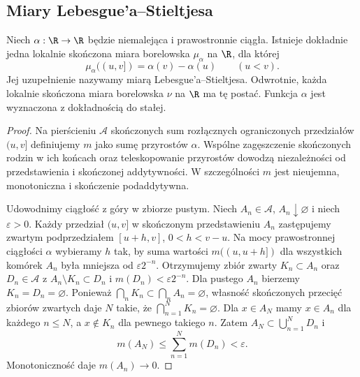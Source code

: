 \subsection*{Miary Lebesgue'a--Stieltjesa}
\begin{twierdzenie}\label{it:thm:stieltjes-construction}
Niech $\alpha:\R\to\R$ będzie niemalejąca i prawostronnie ciągła. Istnieje dokładnie jedna lokalnie skończona miara borelowska $\mu_\alpha$ na $\R$, dla której
\[
 \mu_\alpha((u,v])=\alpha(v)-\alpha(u)\qquad(u<v).
\]
Jej uzupełnienie nazywamy miarą Lebesgue'a--Stieltjesa. Odwrotnie, każda lokalnie skończona miara borelowska $\nu$ na $\R$ ma tę postać. Funkcja $\alpha$ jest wyznaczona z dokładnością do stałej.
\end{twierdzenie}
\begin{proof}
Na pierścieniu $\mathcal A$ skończonych sum rozłącznych ograniczonych przedziałów $(u,v]$ definiujemy $m$ jako sumę przyrostów $\alpha$. Wspólne zagęszczenie skończonych rodzin w ich końcach oraz teleskopowanie przyrostów dowodzą niezależności od przedstawienia i skończonej addytywności. W szczególności $m$ jest nieujemna, monotoniczna i skończenie podaddytywna.

Udowodnimy ciągłość z góry w zbiorze pustym. Niech $A_n\in\mathcal A$, $A_n\downarrow\varnothing$ i niech $\varepsilon>0$. Każdy przedział $(u,v]$ w skończonym przedstawieniu $A_n$ zastępujemy zwartym podprzedziałem $[u+h,v]$, $0<h<v-u$. Na mocy prawostronnej ciągłości $\alpha$ wybieramy $h$ tak, by suma wartości $m((u,u+h])$ dla wszystkich komórek $A_n$ była mniejsza od $\varepsilon 2^{-n}$. Otrzymujemy zbiór zwarty $K_n\subset A_n$ oraz $D_n\in\mathcal A$ z $A_n\setminus K_n\subset D_n$ i $m(D_n)<\varepsilon 2^{-n}$. Dla pustego $A_n$ bierzemy $K_n=D_n=\varnothing$.
Ponieważ $\bigcap_n K_n\subset\bigcap_n A_n=\varnothing$, własność skończonych przecięć zbiorów zwartych daje $N$ takie, że $\bigcap_{n=1}^N K_n=\varnothing$. Dla $x\in A_N$ mamy $x\in A_n$ dla każdego $n\le N$, a $x\notin K_n$ dla pewnego takiego $n$. Zatem $A_N\subset\bigcup_{n=1}^N D_n$ i
\[
 m(A_N)\le \sum_{n=1}^Nm(D_n)<\varepsilon.
\]
Monotoniczność daje $m(A_n)\to0$.


\end{proof}
